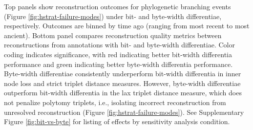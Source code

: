 \begin{figure*}
{  \footnotesize
   Top panels show reconstruction outcomes for phylogenetic branching events (Figure \ref{fig:hstrat-failure-modes}) under bit- and byte-width differentiae, respectively.
   Outcomes are binned by time ago (ranging from most recent to most ancient).
   Bottom panel compares reconstruction quality metrics between reconstructions from annotations with bit- and byte-width differentiae.
   Color coding indicates significance, with red indicating better bit-width differentia performance and green indicating better byte-width differentia performance.
   Byte-width differentiae consistently underperform bit-width differentia in inner node loss and strict triplet distance measures.
   However, byte-width differentiae outperform bit-width differentia in the lax triplet distance measure, which does not penalize polytomy triplets, i.e., isolating incorrect reconstruction from unresolved reconstruction (Figure \ref{fig:hstrat-failure-modes}).
  See Supplementary Figure \ref{fig:bit-vs-byte} for listing of effects by sensitivity analysis condition.
}
  \label{fig:bit-vs-byte-summary}

\end{figure*}
